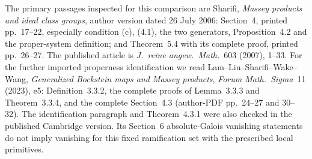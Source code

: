 The primary passages inspected for this comparison are
Sharifi, \emph{Massey products and ideal class groups},
author version dated 26 July 2006: Section~4, printed
pp.~17--22, especially condition (c), (4.1), the two
generators, Proposition~4.2 and the proper-system
definition; and Theorem~5.4 with its complete proof,
printed pp.~26--27.  The published article is
\emph{J.~reine angew.~Math.}~603 (2007), 1--33.
For the further imported properness identification
we read Lam--Liu--Sharifi--Wake--Wang,
\emph{Generalized Bockstein maps and Massey products},
\emph{Forum Math.~Sigma}~11 (2023), e5:
Definition~3.3.2, the complete proofs of
Lemma~3.3.3 and Theorem~3.3.4, and the complete
Section~4.3 (author-PDF pp.~24--27 and 30--32).
The identification paragraph and Theorem~4.3.1
were also checked in the published Cambridge
version.  Its Section~6 absolute-Galois vanishing
statements do not imply vanishing for this fixed
ramification set with the prescribed local
primitives.
